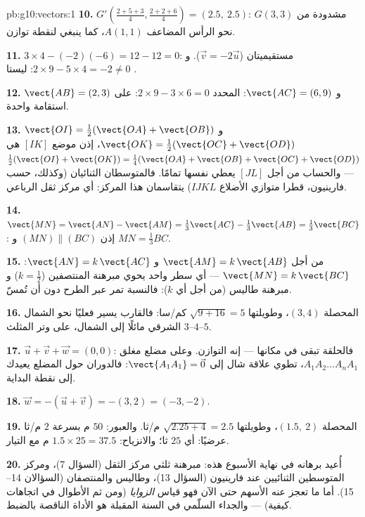 \begin{solution}{pb:g10:vectors:1}
\textbf{10.} $G'\left(\frac{2 + 5 + 3}{4}, \frac{2 + 2 +
6}{4}\right) = (2.5,\ 2.5)$: مشدودة من $G(3,3)$ نحو
الرأس المضاعف $A(1,1)$، كما ينبغي لنقطة توازن.

\textbf{11.} $3 \times 4 - (-2)(-6) = 12 - 12 = 0$: مستقيميتان
($\vec v = -2\vec u$). و$2 \times 9 - 5 \times 4 = -2 \neq 0$:
ليستا .

\textbf{12.} $\vect{AB} = (2, 3)$ و $\vect{AC} = (6, 9)$:
المحدد $2 \times 9 - 3 \times 6 = 0$: على استقامة واحدة.

\textbf{13.} $\vect{OI} = \frac12(\vect{OA} + \vect{OB})$ و
$\vect{OK} = \frac12(\vect{OC} + \vect{OD})$، إذن  موضع 
$[IK]$ هي
$\frac12(\vect{OI} + \vect{OK}) = \frac14(\vect{OA} +
\vect{OB} + \vect{OC} + \vect{OD})$ --- والحساب
من أجل $[JL]$ يعطي  نفسها تمامًا. فالمتوسطان الثنائيان (وكذلك،
حسب فارينيون، قطرا متوازي الأضلاع $IJKL$) يتقاسمان
هذا المركز: أي مركز ثقل الرباعي.

\textbf{14.} $\vect{MN} = \vect{AN} - \vect{AM} =
\frac13\vect{AC} - \frac13\vect{AB} = \frac13\vect{BC}$:
إذن $(MN) \parallel (BC)$ و $MN = \frac13 BC$.

\textbf{15.} من أجل $\vect{AM} = k\,\vect{AB}$ و
$\vect{AN} = k\,\vect{AC}$: $\vect{MN} = k\,\vect{BC}$ --- أي
سطر واحد يحوي مبرهنة المنتصفين ($k = \frac12$) و
مبرهنة طاليس (من أجل أي $k$): فالنسبة تمر عبر الطرح
دون أن تُمسّ.

\textbf{16.} المحصلة $(3, 4)$، وطويلتها
$\sqrt{9 + 16} = 5$ كم/سا: فالقارب يسير فعليًا
نحو الشمال الشرقي مائلًا إلى الشمال، على وتر
المثلث $3$--$4$--$5$.

\textbf{17.} $\vec u + \vec v + \vec w = (0, 0)$: فالحلقة
تبقى في مكانها --- إنه التوازن. وعلى مضلع مغلق
$A_1 A_2 \dots A_n A_1$، تطوي علاقة شال  إلى
$\vect{A_1 A_1} = \vec 0$: فالدوران حول المضلع يعيدك إلى نقطة البداية.

\textbf{18.} $\vec w = -(\vec u + \vec v) = -(3, 2) =
(-3, -2)$.

\textbf{19.} المحصلة $(1.5,\ 2)$، وطويلتها
$\sqrt{2.25 + 4} = 2.5$ م/ثا. والعبور: $50$ م بسرعة $2$ م/ثا
عرضيًا: أي $25$ ثا؛ والانزياح: $1.5 \times 25 = 37.5$ م مع التيار.

\textbf{20.} أُعيد برهانه في نهاية الأسبوع هذه: مبرهنة ثلثي
مركز الثقل (السؤال 7)، ومركز المتوسطين الثنائيين عند فارينيون (السؤال
13)، وطاليس والمنتصفان (السؤالان 14--15). أما ما تعجز عنه الأسهم
حتى الآن فهو قياس \emph{الزوايا} (ومن ثم الأطوال في
اتجاهات كيفية) --- والجداء السلّمي في السنة المقبلة هو
الأداة الناقصة بالضبط.
\end{solution}
